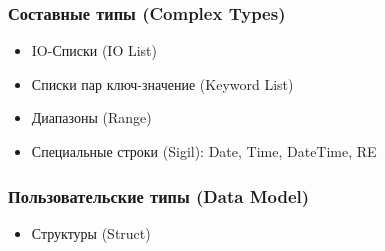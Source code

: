 \documentclass[10pt]{beamer}
\begin{document}
\begin{frame}
  \frametitle{Составные типы (Complex Types)}
  \begin{itemize}
    \item IO-Списки (IO List)
    \item Списки пар ключ-значение (Keyword List)
    \item Диапазоны (Range)
    \item Специальные строки (Sigil): Date, Time, DateTime, RE
  \end{itemize}
\end{frame}

\begin{frame}
  \frametitle{Пользовательские типы (Data Model)}
  \begin{itemize}
    \item Структуры (Struct)
  \end{itemize}
\end{frame}
\end{document}

